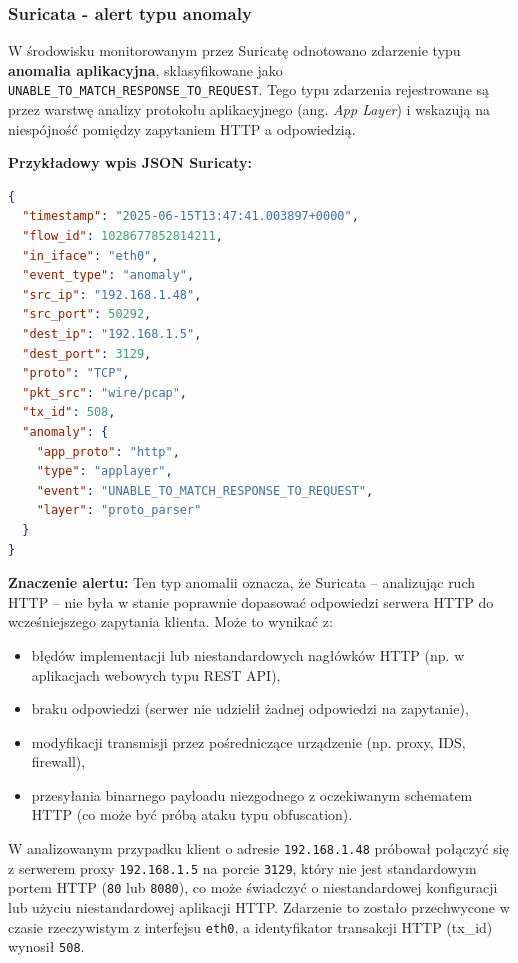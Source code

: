 \documentclass[
    left=2.5cm,         %
    right=2.5cm,        %
    top=2.5cm,          %
    bottom=3cm,         %
    bindingoffset=6mm,  %
    nohyphenation=true %
]{eiti/eiti-thesis} %
\begin{document}

\subsubsection{Suricata - alert typu anomaly}

W środowisku monitorowanym przez Suricatę odnotowano zdarzenie typu \textbf{anomalia aplikacyjna}, sklasyfikowane jako \texttt{UNABLE\_TO\_MATCH\_RESPONSE\_TO\_REQUEST}. Tego typu zdarzenia rejestrowane są przez warstwę analizy protokołu aplikacyjnego (ang. \textit{App Layer}) i wskazują na niespójność pomiędzy zapytaniem HTTP a odpowiedzią.

\textbf{Przykładowy wpis JSON Suricaty:}
\begin{lstlisting}[language=json, caption={Alert typu anomaly: UNABLE\_TO\_MATCH\_RESPONSE\_TO\_REQUEST}, label={lst:suricata-anomaly-mismatch}]
{
  "timestamp": "2025-06-15T13:47:41.003897+0000",
  "flow_id": 1028677852814211,
  "in_iface": "eth0",
  "event_type": "anomaly",
  "src_ip": "192.168.1.48",
  "src_port": 50292,
  "dest_ip": "192.168.1.5",
  "dest_port": 3129,
  "proto": "TCP",
  "pkt_src": "wire/pcap",
  "tx_id": 508,
  "anomaly": {
    "app_proto": "http",
    "type": "applayer",
    "event": "UNABLE_TO_MATCH_RESPONSE_TO_REQUEST",
    "layer": "proto_parser"
  }
}
\end{lstlisting}

\textbf{Znaczenie alertu:}
Ten typ anomalii oznacza, że Suricata – analizując ruch HTTP – nie była w stanie poprawnie dopasować odpowiedzi serwera HTTP do wcześniejszego zapytania klienta. Może to wynikać z:
\begin{itemize}
  \item błędów implementacji lub niestandardowych nagłówków HTTP (np. w aplikacjach webowych typu REST API),
  \item braku odpowiedzi (serwer nie udzielił żadnej odpowiedzi na zapytanie),
  \item modyfikacji transmisji przez pośredniczące urządzenie (np. proxy, IDS, firewall),
  \item przesyłania binarnego payloadu niezgodnego z oczekiwanym schematem HTTP (co może być próbą ataku typu obfuscation).
\end{itemize}

W analizowanym przypadku klient o adresie \texttt{192.168.1.48} próbował połączyć się z serwerem proxy \texttt{192.168.1.5} na porcie \texttt{3129}, który nie jest standardowym portem HTTP (\texttt{80} lub \texttt{8080}), co może świadczyć o niestandardowej konfiguracji lub użyciu niestandardowej aplikacji HTTP. Zdarzenie to zostało przechwycone w czasie rzeczywistym z interfejsu \texttt{eth0}, a identyfikator transakcji HTTP (tx\_id) wynosił \texttt{508}.
\end{document}

